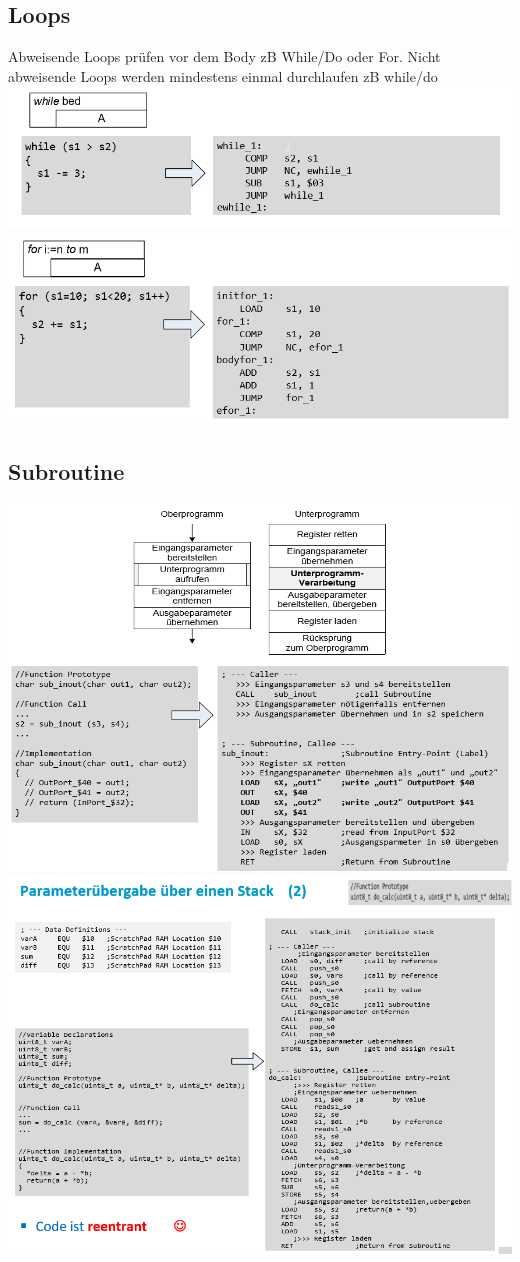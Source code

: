 \subsection{Loops}
Abweisende Loops prüfen vor dem Body zB While/Do oder For. Nicht abweisende Loops werden mindestens einmal durchlaufen zB while/do\\
\includegraphics[width=\linewidth]{Images/while}
\newpage
\includegraphics[width=\linewidth]{Images/for}

\subsection{Subroutine}
\includegraphics[width=\linewidth]{Images/subroutine}
\includegraphics[width=\linewidth]{Images/subroutine_mitparam}


